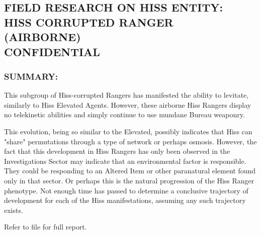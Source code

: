 \subsection*{FIELD RESEARCH ON HISS ENTITY:\\
	HISS CORRUPTED RANGER\\
	(AIRBORNE)\\
	CONFIDENTIAL}
\subsubsection*{SUMMARY:}
\par This subgroup of Hiss-corrupted
Rangers has manifested the ability to
levitate, similarly to Hiss Elevated
Agents. However, these airborne Hiss
Rangers display no telekinetic abilities
and simply continue to use mundane Bureau weaponry.
\par This evolution, being so similar to the Elevated, possibly indicates
that Hiss can "share" permutations through a type of network or
perhaps osmosis. However, the fact that this development in Hiss
Rangers has only been observed in the Investigations Sector may
indicate that an environmental factor is responsible. They could be
responding to an Altered Item or other paranatural element found
only in that sector. Or perhaps this is the natural progression of
the Hiss Ranger phenotype. Not enough time has passed to
determine a conclusive trajectory of development for each of the
Hiss manifestations, assuming any such trajectory exists.
\par Refer to file  for full report.